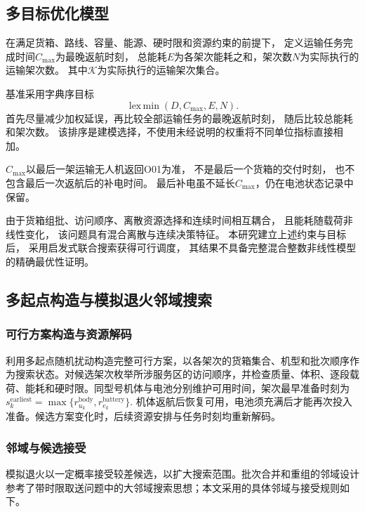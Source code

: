 \documentclass[bwprint]{gmcmthesis}
\begin{document}
\subsection{多目标优化模型}

在满足货箱、路线、容量、能源、硬时限和资源约束的前提下，
定义运输任务完成时间$C_{\max}$为最晚返航时刻，
总能耗$E$为各架次能耗之和，架次数$N$为实际执行的运输架次数。
其中$\mathcal{K}$为实际执行的运输架次集合。

基准采用字典序目标
\begin{equation}
    \operatorname{lex\,min}
    \left(D,C_{\max},E,N\right).
    \label{eq:q2_objective}
\end{equation}
首先尽量减少加权延误，再比较全部运输任务的最晚返航时刻，
随后比较总能耗和架次数。
该排序是建模选择，不使用未经说明的权重将不同单位指标直接相加。

$C_{\max}$以最后一架运输无人机返回O01为准，
不是最后一个货箱的交付时刻，
也不包含最后一次返航后的补电时间。
最后补电虽不延长$C_{\max}$，仍在电池状态记录中保留。

由于货箱组批、访问顺序、离散资源选择和连续时间相互耦合，
且能耗随载荷非线性变化，
该问题具有混合离散与连续决策特征。
本研究建立上述约束与目标后，
采用启发式联合搜索获得可行调度，
其结果不具备完整混合整数非线性模型的精确最优性证明。

\subsection{多起点构造与模拟退火邻域搜索}
\subsubsection{可行方案构造与资源解码}
利用多起点随机扰动构造完整可行方案，以各架次的货箱集合、机型和批次顺序作为搜索状态。对候选架次枚举所涉服务区的访问顺序，并检查质量、体积、逐段载荷、能耗和硬时限。同型号机体与电池分别维护可用时间，架次最早准备时刻为 \(s_k^{\mathrm{earliest}}=\max\{r_{u_k}^{\mathrm{body}},r_{e_k}^{\mathrm{battery}}\}\). 机体返航后恢复可用，电池须充满后才能再次投入准备。候选方案变化时，后续资源安排与任务时刻均重新解码。

\subsubsection{邻域与候选接受}
模拟退火以一定概率接受较差候选，以扩大搜索范围\cite{kirkpatrick1983}。批次合并和重组的邻域设计参考了带时限取送问题中的大邻域搜索思想\cite{ropke2006}；本文采用的具体邻域与接受规则如下。
\end{document}
